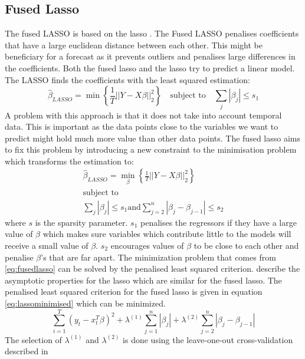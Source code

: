 \subsection{Fused Lasso}
\label{subsec:flasso}
The fused LASSO \citep{Tibshirani2005SparsityLasso} is based on the lasso \citep{Tibshirani1996RegressionLasso}. The Fused LASSO penalises coefficients that have a large euclidean distance between each other. This might be beneficiary for a forecast as it prevents outliers and penalises large differences in the coefficients. Both the fused lasso and the lasso try to predict a linear model. The LASSO finds the coefficients with the least squared estimation: $$\hat{\beta}_{LASSO} = \min \left\{\frac{1}{T}||Y - X\beta||_2^2\right\}\quad \text{subject to} \quad \sum_j|\beta_j| \leq s_1$$
A problem with this approach is that it does not take into account temporal data. This is important as the data points close to the variables we want to predict might hold much more value than other data points. The fused lasso aims to fix this problem by introducing a new constraint to the minimisation problem which transforms the estimation to: 
\begin{equation}
\label{eq:fusedlasso}
  \begin{gathered}
    \hat{\beta}_{LASSO} = \min\limits_{\beta} \left\{\frac{1}{T}||Y - X\beta||_2^2\right\}\\
    \text{subject to} \\
    \sum_j|\beta_j| \leq s_1 \text{and} \sum^n_{j=2}|\beta_j-\beta_{j-1}|\leq s_2
\end{gathered}
\end{equation}
where $s$ is the sparsity parameter. $s_1$ penalises the regressors if they have a large value of $\beta$ which makes sure variables which contribute little to the models will receive a small value of $\beta$. $s_2$ encourages values of $\beta$ to be close to each other and penalise $\beta$'s that are far apart. The minimization problem that comes from \eqref{eq:fusedlasso} can be solved by the penalised least squared criterion. \cite{Knight2000AsymptoticsEstimators} describe the asymptotic properties for the lasso which are similar for the fused lasso. The penalised least squared criterion for the fused lasso is given in equation \eqref{eq:lassominimised} which can be minimized.
\begin{equation}
    \label{eq:lassominimised}
    \sum\limits_{i=1}^T (y_t - x_t^T\beta)^2 + \lambda^{(1)} \sum\limits^n_{j=1} |\beta_j| + \lambda^{(2)}\sum\limits^n_{j=2} |\beta_j - \beta_{j-1}|
\end{equation}
The selection of $\lambda^{(1)}$ and $\lambda^{(2)}$ is done using the leave-one-out cross-validation described in \cite{Hwang2016CrossAcceleration, Cawley2003EEcientClassifiers}
